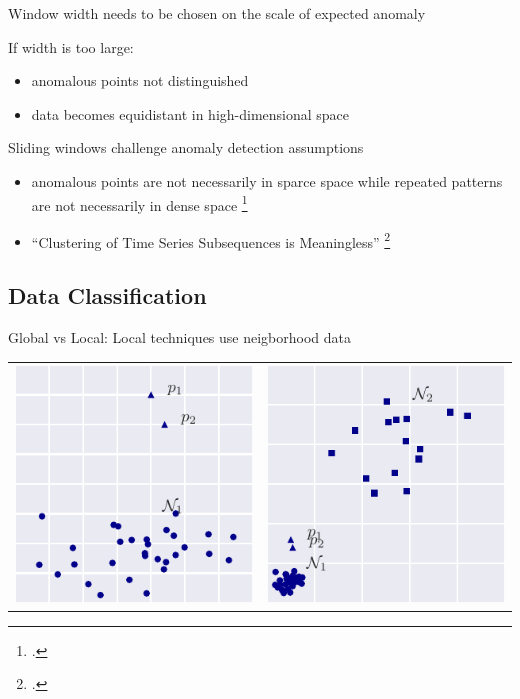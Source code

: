 \documentclass{beamer}
\begin{document}
  \begin{frame}{Window width needs to be chosen on the scale of expected anomaly}
    
    If width is too large:
    \begin{itemize}
      \item anomalous points not distinguished
      \item data becomes equidistant in high-dimensional space
    \end{itemize}

  \end{frame}


  \begin{frame}{Sliding windows challenge anomaly detection assumptions}
    
    \begin{itemize}
      \item anomalous points are not necessarily in sparce space while repeated patterns are not necessarily  in dense space \footcite{Keogh2005}
      \item ``Clustering of Time Series Subsequences is Meaningless'' \footcite{Keogh2004}
    \end{itemize}

  \end{frame}


  \subsection{Data Classification}

  \begin{frame}{Global vs Local: Local techniques use neigborhood data}
    
    \centering
    \begin{tabular}{c|c}
      \includegraphics[width=.45\textwidth]{figs/hard1_dist.pdf} &
      \includegraphics[width=.45\textwidth]{figs/hard2_dist.pdf}
    \end{tabular}

  \end{frame}
\end{document}
